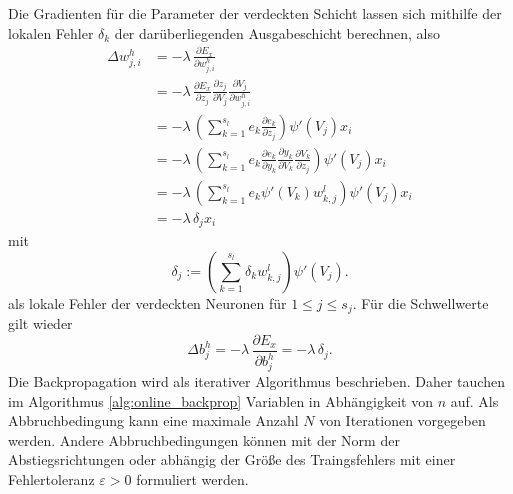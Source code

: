 Die Gradienten für die Parameter der verdeckten Schicht lassen sich mithilfe der lokalen Fehler $\delta_k$ der darüberliegenden Ausgabeschicht berechnen, also
\begin{align*}
    \Delta w_{j,i}^h &= -\lambda\,\frac{\partial E_x}{\partial w_{j,i}^h} \\
                     &= -\lambda\,\frac{\partial E_x}{\partial z_{j}}
                            \frac{\partial z_j}{\partial V_j} 
                            \frac{\partial V_j}{\partial w_{j,i}^h} \\
                    &= -\lambda \,\left( \sum_{k=1}^{s_l} e_k \frac{\partial e_k}{\partial z_j}\right) \psi'(V_j) x_i \\
                    &= -\lambda \,\left( \sum_{k=1}^{s_l} e_k \frac{\partial e_k}{\partial y_k} \frac{\partial y_k}{\partial V_k} \frac{\partial V_k}{\partial z_j}\right) \psi'(V_j) x_i \\
                    &= -\lambda \,\left( \sum_{k=1}^{s_l} e_k \psi'(V_k) w_{k,j}^l \right) \psi'(V_j) x_i \\
                    &= -\lambda \, \delta_j x_i
\end{align*}
mit
\begin{equation*}
    \delta_j:= \left(\sum_{k=1}^{s_l} \delta_k w_{k,j}^l\right) \psi'(V_j).
\end{equation*}
als lokale Fehler der verdeckten Neuronen für $1 \leq j \leq s_j$.
Für die Schwellwerte gilt wieder
\begin{equation*}
    \Delta b_j^h = -\lambda \, \frac{\partial E_x}{\partial b_{j}^h} 
                 = -\lambda \, \delta_j.
\end{equation*}
Die Backpropagation wird als iterativer Algorithmus beschrieben. Daher tauchen im Algorithmus \ref{alg:online_backprop} Variablen in Abhängigkeit von $n$ auf. Als Abbruchbedingung kann eine maximale Anzahl $N$ von Iterationen vorgegeben werden. Andere Abbruchbedingungen können mit der Norm der Abstiegsrichtungen\cite{bishop2006pattern} oder abhängig der Größe des Traingsfehlers mit einer Fehlertoleranz $\varepsilon >0$ formuliert werden.

